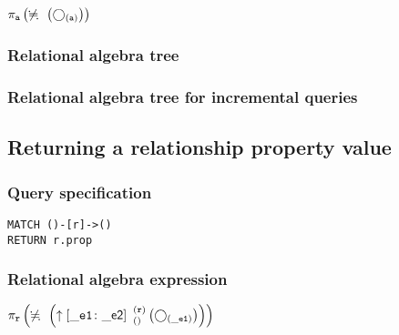 $\projection{\var{a}} \left(\alldifferent{} \left(\getvertices{a}{}\right)\right)$

\subsubsection*{Relational algebra tree}


\subsubsection*{Relational algebra tree for incremental queries}


\subsection{Returning a relationship property value}

\subsubsection*{Query specification}

\begin{lstlisting}
MATCH ()-[r]->()
RETURN r.prop
\end{lstlisting}

\subsubsection*{Relational algebra expression}

$\projection{\var{r}} \left(\alldifferent{} \left(\expandout{\_e1}{\_e2}{}{r}{} \left(\getvertices{\_e1}{}\right)\right)\right)$

